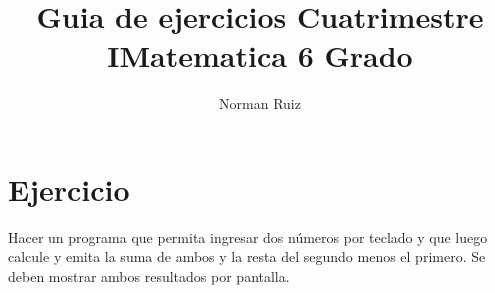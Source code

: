 \documentclass[12pt,a4paper,twoside]{article}
\author{Norman Ruiz}
\title{Guia de ejercicios \linebreak Cuatrimestre I\linebreak Matematica 6 Grado}
\begin{document}
\maketitle
\newpage

\tableofcontents
\newpage

\section{Ejercicio }

\hspace*{1cm}Hacer un programa que permita ingresar dos números por teclado y que luego calcule y emita la suma de ambos y la resta del segundo menos el primero. Se deben mostrar ambos resultados por pantalla.

\newpage
\end{document}
